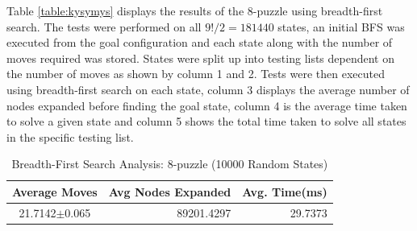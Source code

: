 \documentclass[final]{cmpreport}
\begin{document}
Table \ref{table:kysymys} displays the results of the 8-puzzle using breadth-first search. The tests were performed on all $9!/2=181440$ states, an initial BFS was executed from the goal configuration and each state along with the number of moves required was stored. States were split up into testing lists dependent on the number of moves as shown by column 1 and 2. Tests were then executed using breadth-first search on each state, column 3 displays the average number of nodes expanded before finding the goal state, column 4 is the average time taken to solve a given state and column 5 shows the total time taken to solve all states in the specific testing list.
\begin{table}[ht]
	\caption{Breadth-First Search Analysis: 8-puzzle (10000 Random States)}
	\label{table:bfsRandom}
	\begin{center}
		\begin{tabular}{crr} \hline
			Average Moves & Avg Nodes Expanded & Avg. Time(ms)\\ \hline
			21.7142$\pm$0.065 & 89201.4297 & 29.7373\\ \hline
		\end{tabular}
	\end{center}
\end{table}
\end{document}

